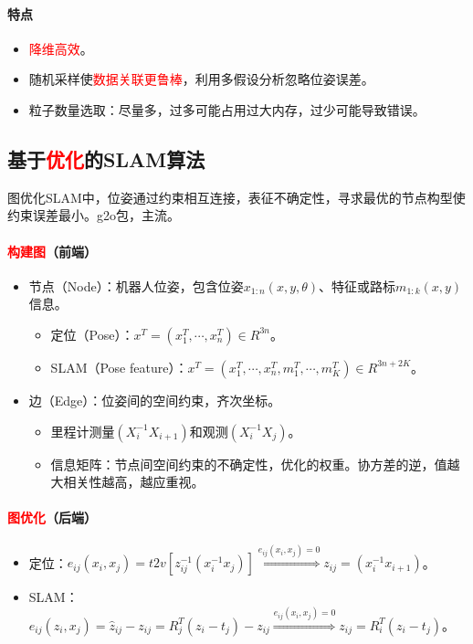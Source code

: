 \documentclass[
12pt, %
a4paper, 
oneside, %
]{scrartcl}
\begin{document}
\paragraph{特点}
\begin{itemize}
\item \textcolor{red}{降维高效}。
\item 随机采样使\textcolor{red}{数据关联更鲁棒}，利用多假设分析忽略位姿误差。
\item 粒子数量选取：尽量多，过多可能占用过大内存，过少可能导致错误。
\end{itemize}
\subsection[基于优化的SLAM算法]{基于\textcolor{red}{优化}的SLAM算法}
图优化SLAM中，位姿通过约束相互连接，表征不确定性，寻求最优的节点构型使约束误差最小。g2o包，主流。
\paragraph{\textcolor{red}{构建图}（前端）}
\begin{itemize}
\item 节点（Node）：机器人位姿，包含位姿$ x_{1:n}(x, y, \theta) $、特征或路标$ m_{1:k}(x, y) $信息。
\begin{itemize}
\item 定位（Pose）：$ x^T = (x_1^T, \cdots, x_n^T) \in R^{3n} $。
\item SLAM（Pose feature）：$ x^T = (x_1^T, \cdots, x_n^T, m_1^T, \cdots, m_K^T) \in R^{3n + 2K} $。
\end{itemize}
\item 边（Edge）：位姿间的空间约束，齐次坐标。
\begin{itemize}
\item 里程计测量$ (X_i^{-1}X_{i + 1}) $和观测$ (X_i^{-1}X_j) $。
\item 信息矩阵：节点间空间约束的不确定性，优化的权重。协方差的逆，值越大相关性越高，越应重视。
\end{itemize}
\end{itemize}
\paragraph{\textcolor{red}{图优化}（后端）}
\begin{itemize}
\item 定位：$ e_{ij}(x_i, x_j) = t2v[z_{ij}^{-1}(x_i^{-1}x_j)] \overset{e_{ij}(x_i, x_j) = 0}{\Longrightarrow} z_{ij} = (x_i^{-1}x_{i + 1}) $。
\item SLAM：$ e_{ij}(z_i, x_j) = \hat{z}_{ij} - z_{ij} = R_j^T(z_i - t_j) - z_{ij} \overset{e_{ij}(x_i, x_j) = 0}{\Longrightarrow} z_{ij} = R_i^T(z_i - t_j) $。
\end{itemize}
\end{document}
